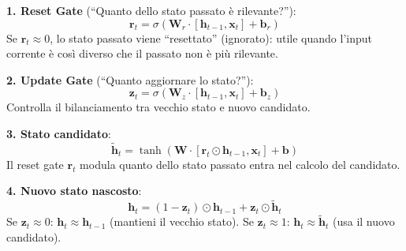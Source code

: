 \documentclass[12pt,a4paper]{article}
\begin{document}
\begin{formulabox}
\textbf{1. Reset Gate} (``Quanto dello stato passato \`e rilevante?''):
\[
    \mathbf{r}_t = \sigma\!\left(\mathbf{W}_r \cdot [\mathbf{h}_{t-1}, \mathbf{x}_t] + \mathbf{b}_r\right)
\]
Se $\mathbf{r}_t \approx 0$, lo stato passato viene ``resettato'' (ignorato): utile quando l'input corrente \`e cos\`i diverso che il passato non \`e pi\`u rilevante.

\textbf{2. Update Gate} (``Quanto aggiornare lo stato?''):
\[
    \mathbf{z}_t = \sigma\!\left(\mathbf{W}_z \cdot [\mathbf{h}_{t-1}, \mathbf{x}_t] + \mathbf{b}_z\right)
\]
Controlla il bilanciamento tra vecchio stato e nuovo candidato.

\textbf{3. Stato candidato}:
\[
    \tilde{\mathbf{h}}_t = \tanh\!\left(\mathbf{W} \cdot [\mathbf{r}_t \odot \mathbf{h}_{t-1}, \mathbf{x}_t] + \mathbf{b}\right)
\]
Il reset gate $\mathbf{r}_t$ modula quanto dello stato passato entra nel calcolo del candidato.

\textbf{4. Nuovo stato nascosto}:
\[
    \mathbf{h}_t = (1 - \mathbf{z}_t) \odot \mathbf{h}_{t-1} + \mathbf{z}_t \odot \tilde{\mathbf{h}}_t
\]
Se $\mathbf{z}_t \approx 0$: $\mathbf{h}_t \approx \mathbf{h}_{t-1}$ (mantieni il vecchio stato).
Se $\mathbf{z}_t \approx 1$: $\mathbf{h}_t \approx \tilde{\mathbf{h}}_t$ (usa il nuovo candidato).
\end{formulabox}
\end{document}
